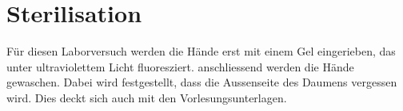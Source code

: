 \section{Sterilisation}
Für diesen Laborversuch werden die Hände erst mit einem Gel eingerieben, das 
unter ultraviolettem Licht fluoresziert. anschliessend werden die Hände 
gewaschen. Dabei wird festgestellt, dass die Aussenseite des Daumens vergessen 
wird. Dies deckt sich auch mit den Vorlesungsunterlagen. 

